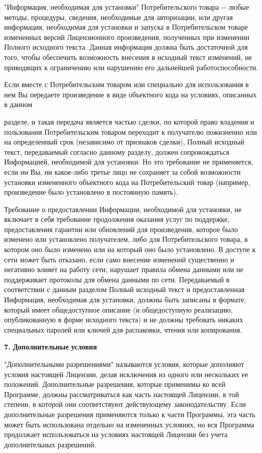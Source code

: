 "{}Информация, необходимая для установки"{} Потребительского товара -\/-\/ любые методы, процедуры, сведения, необходимые для авторизации, или другая информация, необходимая для установки и запуска в Потребительском товаре измененных версий Лицензионного произведения, полученных при изменении Полного исходного текста. Данная информация должна быть достаточной для того, чтобы обеспечить возможность внесения в исходный текст изменений, не приводящих к ограничению или нарушению его дальнейшей работоспособности.

Если вместе с Потребительским товаром или специально для использования в нем Вы передаете произведение в виде объектного кода на условиях, описанных в данном

разделе, и такая передача является частью сделки, по которой право владения и пользования Потребительским товаром переходит к получателю пожизненно или на определенный срок (независимо от признаков сделки), Полный исходный текст, передаваемый согласно данному разделу, должен сопровождаться Информацией, необходимой для установки. Но это требование не применяется, если ни Вы, ни какое-\/либо третье лицо не сохраняет за собой возможности установки измененного объектного кода на Потребительский товар (например, произведение было установлено в постоянную память).

Требование о предоставлении Информации, необходимой для установки, не включает в себя требование продолжения оказания услуг по поддержке, предоставления гарантии или обновлений для произведения, которое было изменено или установлено получателем, либо для Потребительского товара, в котором оно было изменено или на который оно было установлено. В доступе к сети может быть отказано, если само внесение изменений существенно и негативно влияет на работу сети, нарушает правила обмена данными или не поддерживает протоколы для обмена данными по сети. Передаваемый в соответствии с данным разделом Полный исходный текст и предоставленная Информация, необходимая для установки, должны быть записаны в формате, который имеет общедоступное описание (и общедоступную реализацию, опубликованную в форме исходного текста) и не должны требовать никаких специальных паролей или ключей для распаковки, чтения или копирования.

{\bfseries{7.}} {\bfseries{Дополнительные}} {\bfseries{условия}}

"{}Дополнительными разрешениями"{} называются условия, которые дополняют условия настоящей Лицензии, делая исключения из одного или нескольких ее положений. Дополнительные разрешения, которые применимы ко всей Программе, должны рассматриваться как часть настоящей Лицензии, в той степени, в которой они соответствуют действующему законодательству. Если дополнительные разрешения применяются только к части Программы, эта часть может быть использована отдельно на измененных условиях, но вся Программа продолжает использоваться на условиях настоящей Лицензии без учета дополнительных разрешений.

